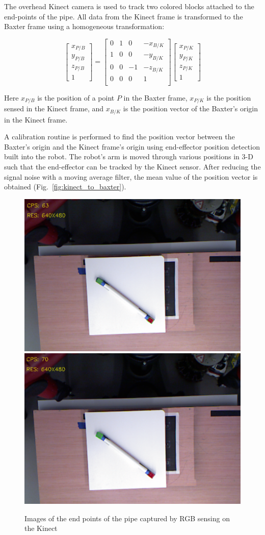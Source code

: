 \documentclass[runningheads,letterpaper]{llncs}
\begin{document}
The overhead Kinect camera is used to track two colored blocks attached to the end-points of the pipe. All data from the Kinect frame is transformed to the Baxter frame using a homogeneous transformation:

\begin{equation}
\left[ \begin{array}{c} x_{P/B} \\ y_{P/B} \\ z_{P/B} \\ 1 \end{array} \right] = \begin{bmatrix} 0 & 1 & 0 & -x_{B/K} \\ 1 & 0 & 0 & -y_{B/K} \\ 0 & 0 & -1 & -z_{B/K} \\ 0 & 0 & 0 & 1 \\ \end{bmatrix} \left[ \begin{array}{c} x_{P/K} \\ y_{P/K} \\ z_{P/K} \\ 1 \end{array} \right]
\end{equation}

Here $x_{P/B}$ is the position of a point $P$ in the Baxter frame, $x_{P/K}$ is the position sensed in the Kinect frame, and $x_{B/K}$ is the position vector of the Baxter's origin in the Kinect frame.

A calibration routine is performed to find the position vector between the Baxter's origin and the Kinect frame's origin using end-effector position detection built into the robot. The robot's arm is moved through various positions in 3-D such that the end-effector can be tracked by the Kinect sensor. After reducing the signal noise with a moving average filter, the mean value of the position vector is obtained (Fig.~\ref{fig:kinect_to_baxter}).

\begin{figure}[ht]
\centering
	\includegraphics[height=0.3\columnwidth]{images/pipe1.png}
	\includegraphics[height=0.3\columnwidth]{images/pipe2.png}	
\caption{Images of the end points of the pipe captured by RGB sensing on the Kinect}
\label{fig:kinect_rgb}
\end{figure}
\end{document}
